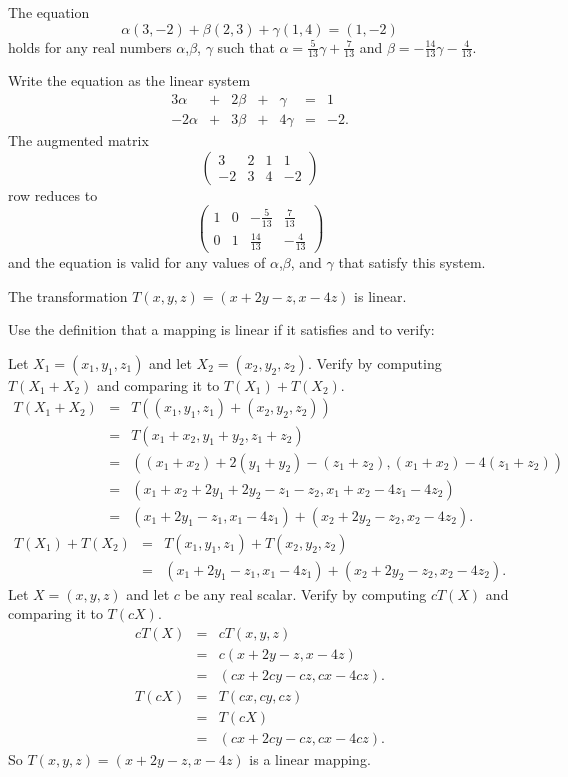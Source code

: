 \documentclass{ximera}
\begin{document}
\ans The equation
\[ \alpha(3,-2) + \beta(2,3) + \gamma(1,4) = (1,-2) \]
holds for any real numbers $\alpha$,$\beta$,
$\gamma$ such that $\alpha = \frac{5}{13}\gamma +
\frac{7}{13}$ and $\beta = -\frac{14}{13}\gamma
- \frac{4}{13}$.

\soln Write the equation as the linear system
\[ \begin{array}{rrrrrrl}
3\alpha & + & 2\beta & + & \gamma & = & 1 \\
-2\alpha & + & 3\beta & + & 4\gamma & = & -2. \end{array} \]
The augmented matrix
\[ \left(\begin{array}{rrr|r}
3 & 2 & 1 & 1 \\
-2 & 3 & 4 & -2 \end{array}\right) \]
row reduces to
\[ \left(\begin{array}{rrr|r}
1 & 0 & -\frac{5}{13} & \frac{7}{13} \\
0 & 1 & \frac{14}{13} & -\frac{4}{13} \end{array}\right) \]
and the equation is valid for any values of $\alpha$,$\beta$,
and $\gamma$ that satisfy this system.

 \ans The transformation $T(x,y,z) = (x + 2y - z, x - 4z)$
is linear.

\soln Use the definition that a mapping is linear if it satisfies
 and  to verify:

\para Let $X_1 = (x_1,y_1,z_1)$ and let $X_2 = (x_2,y_2,z_2)$.
Verify  by computing $T(X_1 + X_2)$ and comparing it
to $T(X_1) + T(X_2)$.
\[ \begin{array}{rcl}
T(X_1 + X_2) & = & T((x_1,y_1,z_1) + (x_2, y_2, z_2)) \\
& = & T(x_1 + x_2, y_1 + y_2, z_1 + z_2) \\
& = & ((x_1 + x_2) + 2(y_1 + y_2) - (z_1 + z_2),
(x_1 + x_2) - 4(z_1 + z_2)) \\ & = &
(x_1 + x_2 + 2y_1 + 2y_2 - z_1 - z_2, x_1 + x_2 - 4z_1 - 4z_2) \\
& = & (x_1 + 2y_1 - z_1, x_1 - 4z_1) +
(x_2 + 2y_2 - z_2, x_2 - 4z_2). \end{array} \]
\[ \begin{array}{rcl}
T(X_1) + T(X_2)
& = & T(x_1,y_1,z_1) + T(x_2,y_2,z_2) \\
& = & (x_1 + 2y_1 - z_1, x_1 - 4z_1) +
(x_2 + 2y_2 - z_2, x_2 - 4z_2). \end{array} \]
Let $X = (x,y,z)$ and let $c$ be any real scalar.  Verify
 by computing $cT(X)$ and comparing it to $T(cX)$.
\[ \begin{array}{rcl}
cT(X) & = & cT(x,y,z) \\
& = & c(x + 2y - z, x - 4z) \\
& = & (cx + 2cy - cz, cx - 4cz). \end{array} \]
\[ \begin{array}{rcl}
T(cX) & = & T(cx,cy,cz) \\
& = & T(cX) \\
& = & (cx + 2cy - cz, cx - 4cz). \end{array} \]
So $T(x,y,z) = (x + 2y - z, x - 4z)$ is a linear mapping.
\end{document}
